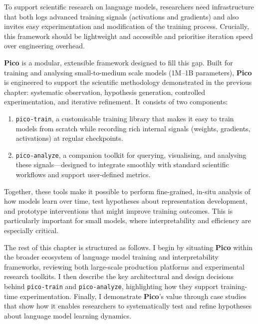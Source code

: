 To support scientific research on language models, researchers need infrastructure that both logs advanced training signals (activations and gradients) and also invites easy experimentation and modification of the training process. Crucially, this framework should be lightweight and accessible and prioritise iteration speed over engineering overhead. 

\textbf{Pico} is a modular, extensible framework designed to fill this gap. Built for training and analysing small-to-medium scale models (1M--1B parameters), \textbf{Pico} is engineered to support the scientific methodology demonstrated in the previous chapter: systematic observation, hypothesis generation, controlled experimentation, and iterative refinement. It consists of two components:

\begin{enumerate}
    \item \texttt{pico-train}, a customisable training library that makes it easy to train models from scratch while recording rich internal signals (weights, gradients, activations) at regular checkpoints.
    \item \texttt{pico-analyze}, a companion toolkit for querying, visualising, and analysing these signals—designed to integrate smoothly with standard scientific workflows and support user-defined metrics.
\end{enumerate}

Together, these tools make it possible to perform fine-grained, in-situ analysis of how models learn over time, test hypotheses about representation development, and prototype interventions that might improve training outcomes. This is particularly important for small models, where interpretability and efficiency are especially critical.


The rest of this chapter is structured as follows. I begin by situating \textbf{Pico} within the broader ecosystem of language model training and interpretability frameworks, reviewing both large-scale production platforms and experimental research toolkits. I then describe the key architectural and design decisions behind \texttt{pico-train} and \texttt{pico-analyze}, highlighting how they support training-time experimentation. Finally, I demonstrate \textbf{Pico}'s value through case studies that show how it enables researchers to systematically test and refine hypotheses about language model learning dynamics.

